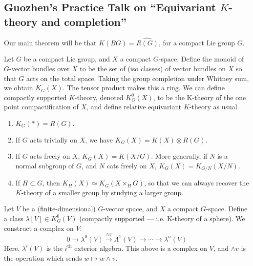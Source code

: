 \documentclass[11pt]{article}
\newcommand{\KanSemResponse}[1]
{
\thispagestyle{fancy}
\section{#1}
}
\begin{document}
\begin{GuozhenEqKthyPractice}
\KanSemResponse
{Guozhen's Practice Talk on ``Equivariant $K$-theory and completion''}
Our main theorem will be that $K(BG)=\widehat{R(G)}$, for a compact Lie group $G$.

\begin{defn*}Let $G$ be a compact Lie group, and $X$ a compact $G$-space. Define the monoid of $G$-vector bundles over $X$ to be the set of (iso classes) of vector bundles on $X$ so that $G$ acts on the total space. Taking the group completion under Whitney sum, we obtain $K_G(X)$. The tensor product makes this a ring. We can define compactly supported $K$-theory, denoted $K^0_G(X)$, to be the K-theory of the one point compactification of $X$, and define relative equivariant $K$-theory as usual.
\end{defn*}
\begin{enumerate}\squishlist
\item $K_G(*)=R(G)$. 
\item If $G$ acts trivially on $X$, we have $K_G(X)=K(X)\otimes R(G)$.
\item If $G$ acts freely on $X$, $K_G(X)=K(X/G)$. More generally, if $N$ is a normal subgroup of $G$, and $N$ cats freely on $X$, $K_G(X)=K_{G/N}(X/N)$.
\item If $H\subset G$, then $K_H(X)\simeq K_G(X\times_H G)$, so that we can always recover the $K$-theory of a smaller group by studying a larger group.
\end{enumerate}
Let $V$ be a (finite-dimensional) $G$-vector space, and $X$ a compact $G$-space. Define a class $\lambda[V]\in K^0_G(V)$ (compactly supported --- i.e. K-theory of a sphere). We construct a complex on $V$:
\[0\to\lambda^0(V)\overset{\wedge v}{\to}\Lambda^1(V)\to\cdots\to \lambda^n(V)\]
Here, $\lambda^i(V)$ is the $i^\text{th}$ exterior algebra. This above is a complex on $V$, and $\wedge v$ is the operation which sends $w\mapsto w\wedge v$.


\end{GuozhenEqKthyPractice}
\end{document}
